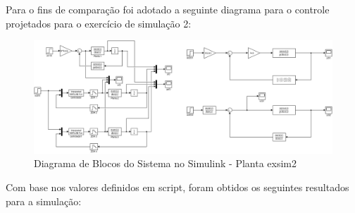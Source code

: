 \documentclass[a4paper,11pt]{article}
\begin{document}
\subsubsection{}

Para o fins de comparação foi adotado a seguinte diagrama para o controle projetados para o exercício de simulação 2:

\begin{figure}[H]
    \centering
    \includegraphics[width=1\linewidth]{img/exsim2model.png}
    \caption{Diagrama de Blocos do Sistema no Simulink - Planta exsim2}
\end{figure}

Com base nos valores definidos em script, foram obtidos os seguintes resultados para a simulação:
\end{document}
